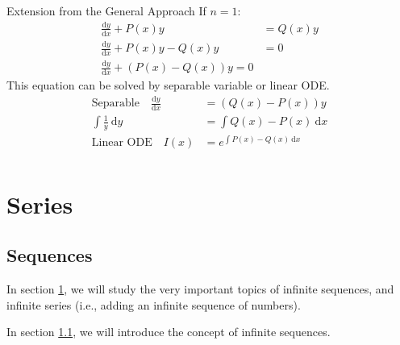 \documentclass[12pt,a4paper]{article}
\def\d{{\mathrm{d}}}
\def\dydx{\frac{\d y}{\d x}}
\def\dx{\d x}
\begin{document}
\begin{ext}{Extension from the General Approach}
	If $n=1$: 
	$$\begin{aligned}
		\dydx+P(x)y&=Q(x)y\\
		\dydx+P(x)y-Q(x)y&=0\\
		\dydx+\left(P(x)-Q(x)\right)y=0
	\end{aligned}$$	
	This equation can be solved by separable variable or linear ODE.
	$$\begin{aligned}
		\boxed{\text{Separable}}\quad\dydx &=\left(Q(x)-P(x)\right)y\\
		\int\frac{1}{y}\ \d y&=\int Q(x)-P(x)\ \dx\\
		\boxed{\text{Linear ODE}}\quad I(x)&=e^{\int P(x)-Q(x)\ \dx}\\
	\end{aligned}$$
\end{ext}

\newpage
\section{Series}\label{series}
\subsection{Sequences}\label{sequence}
In section \ref{series}, we will study the very important topics of infinite sequences, and infinite series (i.e., adding an infinite sequence of numbers).

In section \ref{sequence}, we will introduce the concept of infinite sequences. 
\end{document}
